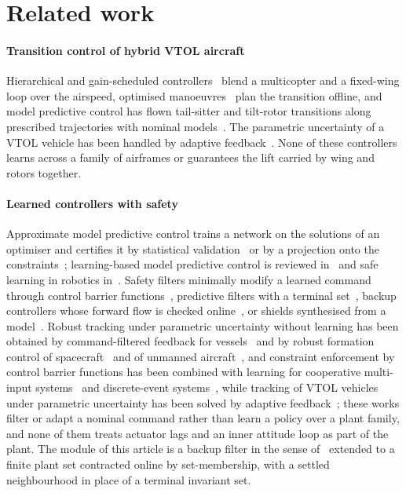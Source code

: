 \documentclass[final,5p,times,twocolumn]{elsarticle}
\begin{document}
\section{Related work}\label{sec:related}
\paragraph{Transition control of hybrid VTOL aircraft} Hierarchical and gain-scheduled controllers~\cite{Lyu2017,Verling2016} blend a multicopter and a fixed-wing loop over the airspeed, optimised manoeuvres~\cite{Maqsood2012} plan the transition offline, and model predictive control has flown tail-sitter and tilt-rotor transitions along prescribed trajectories with nominal models~\cite{Li2018,Allenspach2020,Bauersfeld2021}. The parametric uncertainty of a VTOL vehicle has been handled by adaptive feedback~\cite{Dong2020}. None of these controllers learns across a family of airframes or guarantees the lift carried by wing and rotors together.

\paragraph{Learned controllers with safety} Approximate model predictive control trains a network on the solutions of an optimiser and certifies it by statistical validation~\cite{Hertneck2018} or by a projection onto the constraints~\cite{Chen2018,Karg2020}; learning-based model predictive control is reviewed in~\cite{Hewing2020} and safe learning in robotics in~\cite{Brunke2022}. Safety filters minimally modify a learned command through control barrier functions~\cite{Ames2019}, predictive filters with a terminal set~\cite{Wabersich2021}, backup controllers whose forward flow is checked online~\cite{Gurriet2020}, or shields synthesised from a model~\cite{Alshiekh2018}. Robust tracking under parametric uncertainty without learning has been obtained by command-filtered feedback for vessels~\cite{Dony2020acc} and by robust formation control of spacecraft~\cite{Dony2021jae} and of unmanned aircraft~\cite{Dony2021thesis}, and constraint enforcement by control barrier functions has been combined with learning for cooperative multi-input systems~\cite{Dony2025rs} and discrete-event systems~\cite{Dony2025ieom}, while tracking of VTOL vehicles under parametric uncertainty has been solved by adaptive feedback~\cite{Dong2020}; these works filter or adapt a nominal command rather than learn a policy over a plant family, and none of them treats actuator lags and an inner attitude loop as part of the plant. The module of this article is a backup filter in the sense of~\cite{Gurriet2020,Wabersich2021} extended to a finite plant set contracted online by set-membership, with a settled neighbourhood in place of a terminal invariant set.
\end{document}
